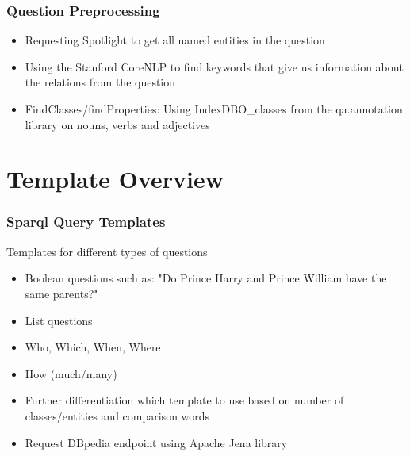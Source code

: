 \documentclass{beamer}
\begin{document}
\begin{frame}
\frametitle{Question Preprocessing}
\begin{itemize}
	\item Requesting Spotlight to get all named entities in the question
	\item Using the Stanford CoreNLP to find keywords that give us information about the relations from the question 
	\item FindClasses/findProperties: Using IndexDBO\_classes from the qa.annotation library on nouns, verbs and adjectives
\end{itemize}
\end{frame}

\section{Template Overview}

\begin{frame}
\frametitle{Sparql Query Templates}
\begin{block}{Templates for different types of questions}
	\begin{itemize}
		\item Boolean questions such as: "Do Prince Harry and Prince William have the same parents?"
		\item List questions
		\item Who, Which, When, Where 
		\item How (much/many)
	\end{itemize}
\end{block}
\begin{itemize}
	\item Further differentiation which template to use based on number of classes/entities and comparison words
	\item Request DBpedia endpoint using Apache Jena library 
\end{itemize}
\end{frame}
\end{document}
